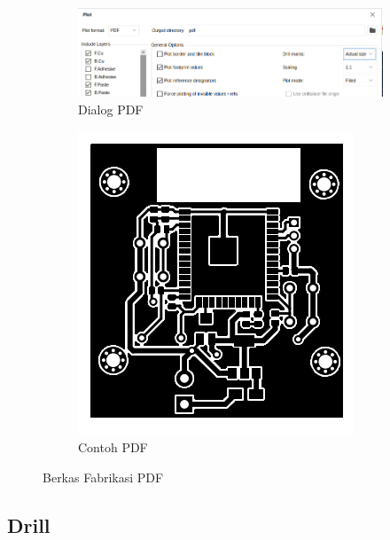 \documentclass[12pt]{book}
\begin{document}
	\begin{figure}[!ht]
		\centering
		\begin{subfigure}[t]{0.65\textwidth}
			\includegraphics[width=\textwidth]{images/fab/fab_4}
			\caption{Dialog PDF}
		\end{subfigure}
		\begin{subfigure}[t]{0.25\textwidth}
			\includegraphics[width=\textwidth]{images/fab/fab_5}
			\caption{Contoh PDF}
		\end{subfigure}
		\caption{Berkas Fabrikasi PDF}
	\end{figure}

	\subsection{Drill}
\end{document}
